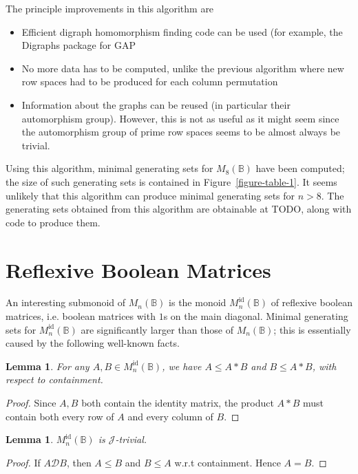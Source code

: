 \documentclass[11pt]{article}
\newtheorem{lemma}[thm]{Lemma}
\numberwithin{equation}{section}
\newcommand{\B}{\mathbb{B}}
\newcommand{\Bn}{M_n(\B)}
\newcommand{\Bm}[1]{M_{#1}(\B)}
\newcommand{\Refn}{M_n^{\text{id}}(\B)}
\newcommand{\D}{\mathscr{D}}
\newcommand{\J}{\mathscr{J}}
\begin{document}
The principle improvements in this algorithm are
\begin{itemize}
  \item 
    Efficient digraph homomorphism finding code can be used (for example, the
    Digraphs package for GAP~\cite{Digraphs2020aa}
  \item
    No more data has to be computed, unlike the previous algorithm where new row
    spaces had to be produced for each column permutation
  \item
    Information about the graphs can be reused (in particular their automorphism
    group). However, this is not as useful as it might seem since the
    automorphism group of prime row spaces seems to be almost always be trivial.
\end{itemize}

Using this algorithm, minimal generating sets for $\Bm{8}$ have been computed;
the size of such generating sets is contained in Figure~\ref{figure-table-1}. It
seems unlikely that this algorithm can produce minimal generating sets for $n >
8$. The generating sets obtained from this algorithm are obtainable at TODO,
along with code to produce them.

\section{Reflexive Boolean Matrices}
An interesting submonoid of $\Bn$ is the monoid $\Refn$ of reflexive boolean
matrices, i.e. boolean matrices with $1$s on the main diagonal. Minimal
generating sets for $\Refn$ are significantly larger than those of $\Bn$; this
is essentially caused by the following well-known facts.

\begin{lemma}
  For any $A, B \in \Refn$, we have $A \leq A * B$ and $B \leq A * B$, with
  respect to containment.
\end{lemma}
\begin{proof}
  Since $A, B$ both contain the identity matrix, the product $A * B$ must
  contain both every row of $A$ and every column of $B$.
\end{proof}

\begin{lemma}
  $\Refn$ is $\J$-trivial. 
\end{lemma}
\begin{proof}
  If $A \D B$, then $A \leq B$ and $B \leq A$ w.r.t containment. Hence $A = B$.    
\end{proof}
\end{document}

